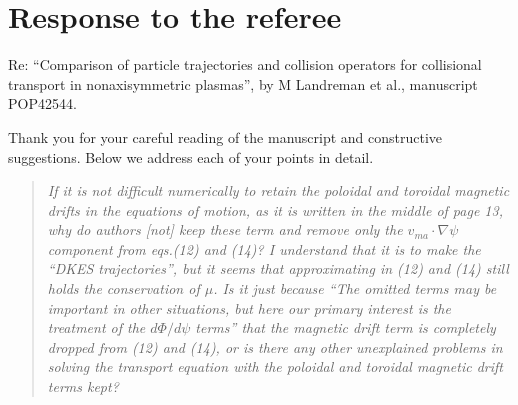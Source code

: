 \documentclass[11pt]{article}
\newenvironment{referee}{\begin{quote}\it\color{Blue}}{\end{quote}}
\begin{document}
  
\section*{Response to the referee}

Re: ``Comparison of particle trajectories and collision operators for
collisional transport in nonaxisymmetric plasmas'', by
M Landreman et al., manuscript POP42544.\newline


Thank you for your careful reading of the manuscript and constructive suggestions.
Below we address each of your points in detail.

\begin{referee}
If it is not difficult numerically to retain the poloidal and toroidal magnetic drifts in the
equations of motion, as it is written in the middle of page 13, why do authors [not] keep these term
and remove only the $v_{ma}\cdot\nabla\psi$ component from eqs.(12) and (14)? I understand that it is to make
the ``DKES trajectories'', but it seems that approximating in (12) and (14) still
holds the conservation of $\mu$. Is it just because ``The omitted terms may be important in other
situations, but here our primary interest is the treatment of the $d\Phi/d\psi$ terms'' that the magnetic
drift term is completely dropped from (12) and (14), or is there any other unexplained problems
in solving the transport equation with the poloidal and toroidal magnetic drift terms kept?
\end{referee}
\end{document}
